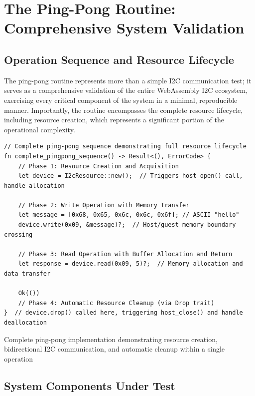 \section{The Ping-Pong Routine: Comprehensive System Validation}
\label{sec:ping-pong-routine}

\subsection{Operation Sequence and Resource Lifecycle}

The ping-pong routine represents more than a simple I2C communication test; it serves as a comprehensive validation of the entire WebAssembly I2C ecosystem, exercising every critical component of the system in a minimal, reproducible manner. Importantly, the routine encompasses the complete resource lifecycle, including resource creation, which represents a significant portion of the operational complexity.

\begin{listing}[H]
\begin{verbatim}
// Complete ping-pong sequence demonstrating full resource lifecycle
fn complete_pingpong_sequence() -> Result<(), ErrorCode> {
    // Phase 1: Resource Creation and Acquisition
    let device = I2cResource::new();  // Triggers host_open() call, handle allocation
    
    // Phase 2: Write Operation with Memory Transfer
    let message = [0x68, 0x65, 0x6c, 0x6c, 0x6f]; // ASCII "hello"
    device.write(0x09, &message)?;  // Host/guest memory boundary crossing
    
    // Phase 3: Read Operation with Buffer Allocation and Return
    let response = device.read(0x09, 5)?;  // Memory allocation and data transfer
    
    Ok(())
    // Phase 4: Automatic Resource Cleanup (via Drop trait)
}  // device.drop() called here, triggering host_close() and handle deallocation
\end{verbatim}
\caption{Complete ping-pong implementation demonstrating resource creation, bidirectional I2C communication, and automatic cleanup within a single operation}
\label{lst:complete-pingpong}
\end{listing}

\subsection{System Components Under Test}

